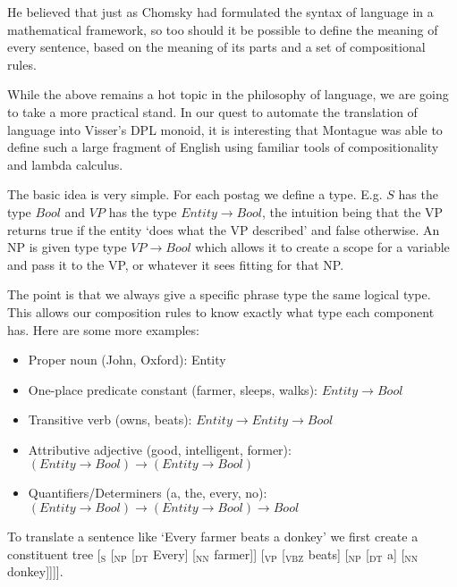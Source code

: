 \documentclass[12pt]{article}
\begin{document}
He believed that just as Chomsky had formulated the syntax of language in a mathematical framework, so too should it be possible to define the meaning of every sentence, based on the meaning of its parts and a set of compositional rules.

While the above remains a hot topic in the philosophy of language, we are going to take a more practical stand. In our quest to automate the translation of language into Visser's DPL monoid, it is interesting that Montague was able to define such a large fragment of English using familiar tools of compositionality and lambda calculus.

The basic idea is very simple. For each postag we define a type. E.g. $S$ has the type $Bool$ and $VP$ has the type $Entity \rightarrow Bool$, the intuition being that the VP returns true if the entity `does what the VP described' and false otherwise. An NP is given type type $VP \rightarrow Bool$ which allows it to create a scope for a variable and pass it to the VP, or whatever it sees fitting for that NP.

The point is that we always give a specific phrase type the same logical type. This allows our composition rules to know exactly what type each component has. Here are some more examples:
\begin{itemize}
\item Proper noun (John, Oxford): Entity
\item One-place predicate constant (farmer, sleeps, walks): $Entity \rightarrow Bool$
\item Transitive verb (owns, beats): $Entity \rightarrow Entity \rightarrow Bool$
\item Attributive adjective (good, intelligent, former): $(Entity \rightarrow Bool) \rightarrow (Entity \rightarrow Bool)$
\item Quantifiers/Determiners (a, the, every, no): $(Entity \rightarrow Bool) \rightarrow (Entity \rightarrow Bool) \rightarrow Bool$
\end{itemize}

To translate a sentence like `Every farmer beats a donkey' we first create a constituent tree [$_\text{S}$ [$_\text{NP}$ [$_\text{DT}$ Every] [$_\text{NN}$ farmer]] [$_\text{VP}$ [$_\text{VBZ}$ beats] [$_\text{NP}$ [$_\text{DT}$ a] [$_\text{NN}$ donkey]]]].
\end{document}
